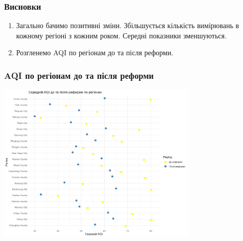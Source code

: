 \documentclass{beamer}
\begin{document}
\begin{frame}
  \frametitle{Висновки}

  \begin{enumerate}
    \item Загально бачимо позитивні зміни. 
    Збільшується кількість вимірювань в кожному регіоні з кожним роком. 
    Середні показники зменшуються.
    \item Розгленемо AQI по регіонам до та після реформи.
  \end{enumerate}
\end{frame}

\begin{frame}
  \frametitle{AQI по регіонам до та після реформи}

  \begin{center}
    \includegraphics[height=3in]{./plots/lab2/1-4-part/aqi_comparison_before_after.png}
  \end{center}
\end{frame}
\end{document}
